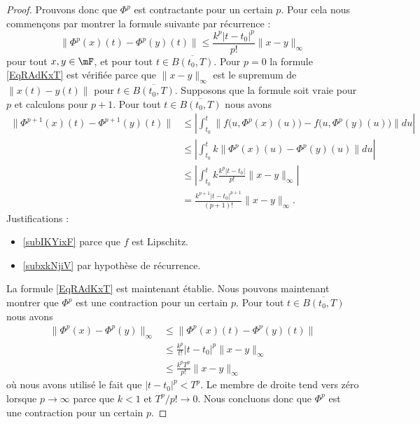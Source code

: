 \begin{proof}
    Prouvons donc que \( \Phi^p\) est contractante pour un certain \( p\). Pour cela nous commençons par montrer la formule suivante par récurrence :
    \begin{equation}        \label{EqRAdKxT}
        \big\| \Phi^p(x)(t)-\Phi^p(y)(t) \big\|\leq \frac{ k^p| t-t_0 |^p }{ p! }\| x-y \|_{\infty}
    \end{equation}
    pour tout \( x,y\in\mF\), et pour tout \( t\in\overline{ B(t_0,T) }\). Pour \( p=0\) la formule \eqref{EqRAdKxT} est vérifiée parce que \( \| x-y \|_{\infty}\) est le supremum de \( \| x(t)-y(t) \|\) pour \( t\in\overline{ B(t_0,T) }\). Supposons que la formule soit vraie pour \( p\) et calculons pour \( p+1\). Pour tout \( t\in\overline{ B(t_0,T) }\) nous avons
    \begin{subequations}
        \begin{align}
            \big\| \Phi^{p+1}(x)(t)-\Phi^{p+1}(y)(t) \big\|&\leq \left| \int_{t_0}^t\big\| f\big( u,\Phi^p(x)(u) \big)-f\big( u,\Phi^p(y)(u) \big) \big\|du \right| \\
            &\leq \left| \int_{t_0}^tk\| \Phi^p(x)(u)-\Phi^p(y)(u) \|du \right|    \label{subIKYixF}\\
            &\leq \left| \int_{t_0}^tk\frac{ k^p| t-t_0 | }{ p! }\| x-y \|_{\infty} \right| \label{subxkNjiV} \\
            &=\frac{ k^{p+1}| t-t_0 |^{p+1} }{ (p+1)! }\| x-y \|_{\infty}.
        \end{align}
    \end{subequations}
    Justifications :
    \begin{itemize}
        \item \eqref{subIKYixF} parce que \( f\) est Lipschitz.
        \item \eqref{subxkNjiV} par hypothèse de récurrence.
    \end{itemize}
    La formule \eqref{EqRAdKxT} est maintenant établie. Nous pouvons maintenant montrer que \( \Phi^p\) est une contraction pour un certain \( p\). Pour tout \( t\in \overline{ B(t_0,T) }\) nous avons
    \begin{subequations}
        \begin{align}
        \big\| \Phi^p(x)-\Phi^p(y) \big\|_{\infty}&\leq \| \Phi^p(x)(t)-\Phi^p(y)(t) \|\\
        &\leq \frac{ k^p }{ t! }| t-t_0 |^p\| x-y \|_{\infty}\\
        &\leq \frac{ k^pT^p }{ p! }\| x-y \|_{\infty}
        \end{align}
    \end{subequations}
    où nous avons utilisé le fait que \( | t-t_0 |^p<T^p\). Le membre de droite tend vers zéro lorsque \( p\to\infty\) parce que \( k<1\) et \( T^p/p!\to 0\). Nous concluons donc que \( \Phi^p\) est une contraction pour un certain \( p\).


\end{proof}
